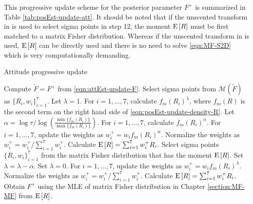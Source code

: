 This progressive update scheme for the posterior parameter $F^+$ is summarized in Table \ref{tab:posEst-update-att}.
It should be noted that if the unscented transform in \cite{lee2018bayesian} is used to select sigma points in step 12, the moment $\mathrm{E}\left[ R \right]$ must be first matched to a matrix Fisher distribution.
Whereas if the unscented transform in \cite{gilitschenski2015unscented} is used, $\mathrm{E}\left[ R \right]$ can be directly used and there is no need to solve \eqref{eqn:MF-S2D} which is very computationally demanding.

\begin{table}
	\caption{Attitude progressive update}
	\label{tab:posEst-update-att}
	\begin{algorithmic}[1]
		\algrule[0.8pt]
		\algrule
		\State Compute $\tilde{F} = F^+$ from \eqref{eqn:attEst-update-F}.
		\State Select sigma points \cite{gilitschenski2015unscented,lee2018bayesian} from $\mathcal{M}(\tilde{F})$ as $\{R_i,w_i\}_{i=1}^7$.
		\State Let $\lambda = 1$.
		\State For $i=1,\ldots,7$, calculate $f_m(R_i)^\lambda$, where $f_m(R)$ is the second term on the right hand side of \eqref{eqn:posEst-update-density-R}.
		\State Let $\alpha = \log\tau / \log\left( \tfrac{\min\{f_m(R_i)\}}{\max\{f_m(R_i)\}} \right)$.
		\State For $i=1,\ldots,7$, calculate $f_m(R_i)^\alpha$.
		\State For $i=1,\ldots,7$, update the weights as $w_i^+ = w_i f_m(R_i)^\alpha$.
		\State Normalize the weights as $w_i^+ = w_i^+/\sum_{i=1}^7 w_i^+$.
		\State Calculate $\mathrm{E}\left[ R \right] = \sum_{i=1}^7 w_i^+ R_i$.
		\State Select sigma points $\{R_i,w_i\}_{i=1}^7$ from the matrix Fisher distribution that has the moment $\mathrm{E}\left[ R \right]$.
		\State Set $\lambda = \lambda-\alpha$.
		\Else
		\State Set $\lambda = 0$.
		\EndIf
		\EndWhile
		\State For $i=1,\ldots,7$, update the weights as $w_i^+ = w_i f_m(R_i)^\lambda$.
		\State Normalize the weights as $w_i^+ = w_i^+/\sum_{i=1}^7 w_i^+$.
		\State Calculate $\mathrm{E}\left[ R \right] = \sum_{i=1}^7 w_i^+ R_i$.
		\State Obtain $F^+$ using the MLE of matrix Fisher distribution in Chapter \ref{section:MF-MF} from $\mathrm{E}\left[ R \right]$.
		\EndProcedure
		\algrule[0.8pt]
	\end{algorithmic}
\end{table}

